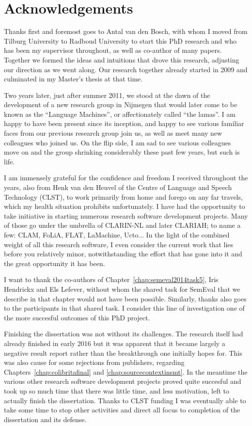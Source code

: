 \chapter*{Acknowledgements}

Thanks first and foremost goes to Antal van den Bosch, with whom I moved from
Tilburg University to Radboud University to start this PhD research and who has
been my supervisor throughout, as well as co-author of many papers. Together we formed
the ideas and intuitions that drove this research, adjusting our direction as
we went along. Our research together already started in 2009
and culminated in my Master's thesis at that time.

Two years later, just after summer 2011, we stood at the dawn of the
development of a new research group in Nijmegen that would later come to be
known as the ``Language Machines'', or affectionately called ``the lamas''.  I
am happy to have been present since its inception, and happy to see
various familiar faces from our previous research group join us, as well as
meet many new colleagues who joined us. On the flip side, I am sad to see various colleagues
move on and the group shrinking considerably these past few years, but such is life.

I am immensely grateful for the confidence and freedom I received throughout the
years, also from Henk van den Heuvel of the Centre of Language and Speech
Technology (CLST), to work primarily from home and forego on any far travels,
which my health situation prohibits unfortunately. I have had the opportunity to take
initiative in starting numerous research software development projects. Many of
those go under the umbrella of CLARIN-NL and later CLARIAH; to name a few:
CLAM, FoLiA, FLAT, LaMachine, Ucto... In the light of the combined weight of
all this research software, I even consider the current work that lies before
you relatively minor, notwithstanding the effort that has gone into it and the
great opportunity it has been.

I want to thank the co-authors of Chapter~\ref{chap:semeval2014task5}, Iris
Hendrickx and Els Lefever, without whom the shared task for SemEval that we
describe in that chapter would not have been possible. Similarly, thanks also
goes to the participants in that shared task. I consider this line of
investigation one of the more succesful outcomes of this PhD project.

Finishing the dissertation was not without its challenges. The research itself
had already finished in early 2016 but it was apparent that it became largely a
negative result report rather than the breakthrough one initially hopes for.
This was also cause for some rejections from publishers, regarding
Chapters~\ref{chap:colibritafinal} and \ref{chap:sourcecontextinsmt}. In the
meantime the various other research software development projects proved quite
succesful and took up so much time that there was little time, and less
motivation, left to actually finish the dissertation. Thanks to CLST funding I
was eventually able to take some time to stop other activities and direct
all focus to completion of the dissertation and its defense.

